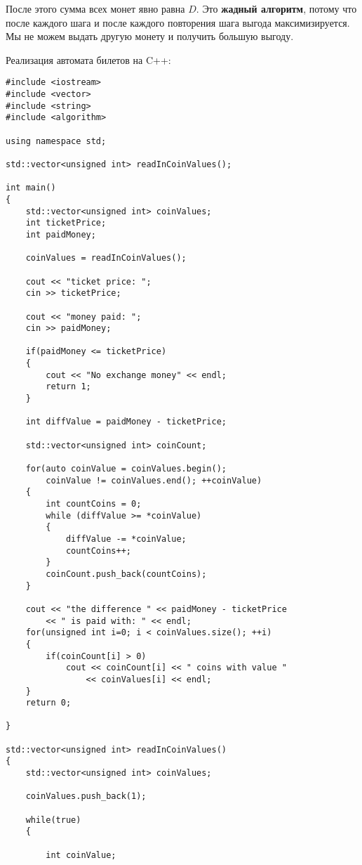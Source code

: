 \vspace{\baselineskip}

После этого сумма всех монет явно равна $D$. Это \textbf{жадный алгоритм}, потому что после каждого шага и после каждого повторения шага выгода максимизируется. Мы не можем выдать другую монету и получить большую выгоду.

Реализация автомата билетов на C++:

\begin{tcolorbox}
\begin{verbatim}
#include <iostream>
#include <vector>
#include <string>
#include <algorithm>

using namespace std;

std::vector<unsigned int> readInCoinValues();

int main()
{
    std::vector<unsigned int> coinValues;
    int ticketPrice;
    int paidMoney;
    
    coinValues = readInCoinValues();
    
    cout << "ticket price: ";
    cin >> ticketPrice;
    
    cout << "money paid: ";
    cin >> paidMoney;
    
    if(paidMoney <= ticketPrice)
    {
        cout << "No exchange money" << endl;
        return 1;
    }
    
    int diffValue = paidMoney - ticketPrice;
    
    std::vector<unsigned int> coinCount;
    
    for(auto coinValue = coinValues.begin();
        coinValue != coinValues.end(); ++coinValue)
    {
        int countCoins = 0;
        while (diffValue >= *coinValue)
        {
            diffValue -= *coinValue;
            countCoins++;
        }
        coinCount.push_back(countCoins);
    }
    
    cout << "the difference " << paidMoney - ticketPrice
        << " is paid with: " << endl;
    for(unsigned int i=0; i < coinValues.size(); ++i)
    {
        if(coinCount[i] > 0)
            cout << coinCount[i] << " coins with value "
                << coinValues[i] << endl;
    }
    return 0;

}

std::vector<unsigned int> readInCoinValues()
{
    std::vector<unsigned int> coinValues;
    
    coinValues.push_back(1);
    
    while(true)
    {
        
        int coinValue;
        

\end{verbatim}
\end{tcolorbox}
